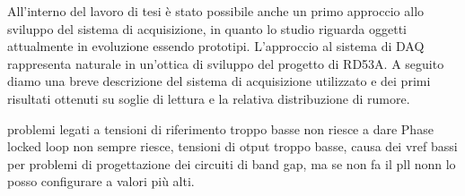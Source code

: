 All'interno del lavoro di tesi è stato possibile anche un primo approccio allo sviluppo del sistema di acquisizione, in quanto lo studio riguarda oggetti attualmente in evoluzione essendo prototipi. L'approccio al sistema di DAQ rappresenta naturale in un'ottica di sviluppo del progetto di RD53A. A seguito diamo una breve descrizione del sistema di acquisizione utilizzato e dei primi risultati ottenuti su soglie di lettura e la relativa distribuzione di rumore. 



problemi legati a tensioni di riferimento troppo basse non riesce a dare Phase locked loop non sempre riesce, tensioni di otput troppo basse, causa dei vref bassi per problemi di progettazione dei circuiti di band gap, ma se non fa il pll nonn lo posso configurare a valori più alti.

